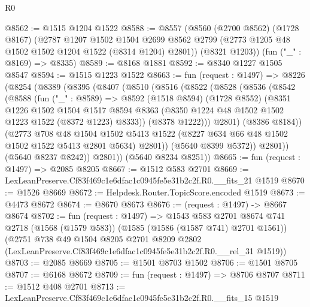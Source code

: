 \begin{lexlean}{R0}
\begin{coremodule}
@8562 := @1515 @1204 @1522
@8588 := @8557
    (@8560
      (@2700 @8562)
      (@1728 @8167)
      (@2787
        @1207
        @1502
        @1504
        @2699
        @8562
        @2799
        (@2773 @1205 @48 @1502 @1502 @1204 @1522 (@8314 @1204) @2801))
      (@8321 @1203))
    (fun ("_" : @8169) => @8335)
@8589 := @8168 @1881
@8592 := @8340 @1227 @1505 @8547
@8594 := @1515 @1223 @1522
@8663 := fun (request : @1497) =>
  @8226
    (@8254
      (@8389
        (@8395
          (@8407
            (@8510
              (@8516
                (@8522
                  (@8528
                    (@8536
                      (@8542
                        (@8588
                          (fun ("_" : @8589) =>
                          @8592
                            (@1518 @8594)
                            (@1728 @8552)
                            (@8351
                              @1226
                              @1502
                              @1504
                              @1517
                              @8594
                              @8363
                              (@8350 @1224 @48 @1502 @1502 @1223 @1522 (@8372 @1223) @8333))
                            (@8378 @1222)))
                        @2801)
                      (@8386 @8184))
                    (@2773
                      @708
                      @48
                      @1504
                      @1502
                      @5413
                      @1522
                      (@8227 @634 @66 @48 @1502 @1502 @1522 @5413 @2801 @5634)
                      @2801))
                  (@5640 @8399 @5372))
                @2801))
            (@5640 @8237 @8242))
          @2801))
      (@5640 @8234 @8251))
@8665 := fun (request : @1497) => @2085 @8205
@8667 := @1512 @583 @2701
@8669 := LexLeanPreserve.Cf83f469c1e6dfac1c0945fe5e31b2c2f.R0.__fits_21 @1519
@8670 := @1526 @8669
@8672 := Helpdesk.Router.TopicScore.encoded @1519
@8673 := @4473 @8672
@8674 := @8670 @8673
@8676 := (request : @1497) -> @8667 @8674
@8702 := fun (request : @1497) =>
  @1543
    @583
    @2701
    @8674
    @741
    @2718
    (@1568 (@1579 @583))
    (@1585 (@1586 (@1587 @741) @2701 @1561))
    (@2751
      @738
      @49
      @1504
      @8205
      @2701
      @8209
      @2802
      (LexLeanPreserve.Cf83f469c1e6dfac1c0945fe5e31b2c2f.R0.__rel_31 @1519))
@8703 := @2085 @8669
@8705 := @1501 @8703 @1502
@8706 := @1501 @8705
@8707 := @6168 @8672
@8709 := fun (request : @1497) => @8706 @8707
@8711 := @1512 @408 @2701
@8713 := LexLeanPreserve.Cf83f469c1e6dfac1c0945fe5e31b2c2f.R0.__fits_15 @1519

\end{coremodule}
\end{lexlean}
